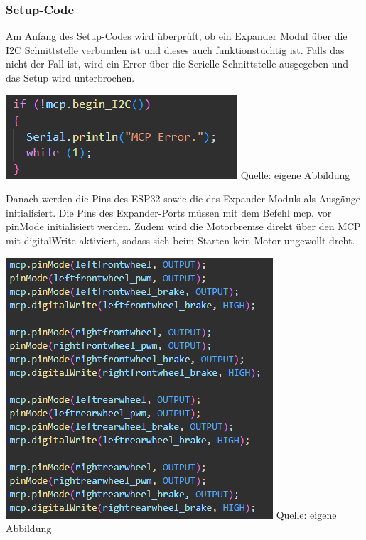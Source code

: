 \documentclass[ngerman,12pt,a4paper]{article}
\begin{document}
		\subsubsection{Setup-Code}
		Am Anfang des Setup-Codes wird überprüft, ob ein Expander Modul über die I2C Schnittstelle verbunden ist und dieses auch funktionstüchtig ist. Falls das nicht der Fall ist, wird ein Error über die Serielle Schnittstelle ausgegeben und das Setup wird unterbrochen. \\[0.5cm]
		\begin{minipage}{\textwidth}
			\centering
			\includegraphics[scale=1.05]{Pictures/code_mcp_if_motoren}
			\label{fig:code_mcp_if_motoren}
			\vspace{-2pt}
			\small Quelle: eigene Abbildung
			\vspace{10pt}
		\end{minipage}	
		Danach werden die Pins des ESP32 sowie die des Expander-Moduls als Ausgänge initialisiert. Die Pins des Expander-Ports müssen mit dem Befehl mcp. vor pinMode initialisiert werden. Zudem wird die Motorbremse direkt über den MCP mit digitalWrite aktiviert, sodass sich beim Starten kein Motor ungewollt dreht.  \\[0.5cm]
		\begin{minipage}{\textwidth}
			\centering
			\includegraphics[scale=1.05]{Pictures/code_intialisierung_motoren}
			\label{fig:code_intialisierung_motoren}
			\vspace{-2pt}
			\small Quelle: eigene Abbildung
			\vspace{10pt}
		\end{minipage}	
\end{document}
